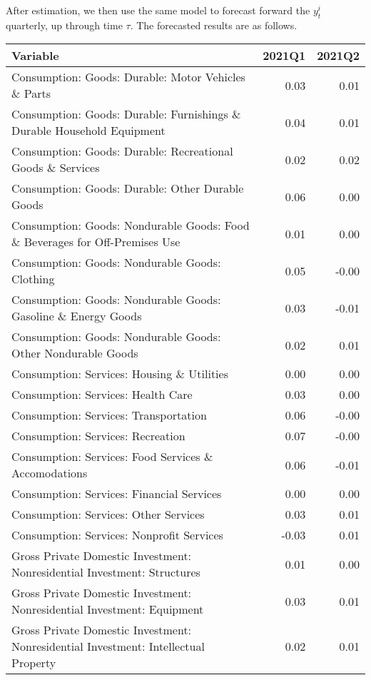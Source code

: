 \documentclass[11pt, letterpaper]{article}\usepackage[]{graphicx}\usepackage[]{color}
\begin{document}
After estimation, we then use the same model to forecast forward the $y^i_t$ quarterly, up through time $\tau$. 
The forecasted results are as follows.
\begin{table}[H]
\centering
\begingroup\scriptsize
\begin{tabular}{lrr}
  \hline
Variable & 2021Q1 & 2021Q2 \\ 
  \hline
Consumption: Goods: Durable: Motor Vehicles \& Parts & 0.03 & 0.01 \\ 
  Consumption: Goods: Durable: Furnishings \& Durable Household Equipment & 0.04 & 0.01 \\ 
  Consumption: Goods: Durable: Recreational Goods \& Services & 0.02 & 0.02 \\ 
  Consumption: Goods: Durable: Other Durable Goods & 0.06 & 0.00 \\ 
  Consumption: Goods: Nondurable Goods: Food \& Beverages for Off-Premises Use & 0.01 & 0.00 \\ 
  Consumption: Goods: Nondurable Goods: Clothing & 0.05 & -0.00 \\ 
  Consumption: Goods: Nondurable Goods: Gasoline \& Energy Goods & 0.03 & -0.01 \\ 
  Consumption: Goods: Nondurable Goods: Other Nondurable Goods & 0.02 & 0.01 \\ 
  Consumption: Services: Housing \& Utilities & 0.00 & 0.00 \\ 
  Consumption: Services: Health Care & 0.03 & 0.00 \\ 
  Consumption: Services: Transportation & 0.06 & -0.00 \\ 
  Consumption: Services: Recreation & 0.07 & -0.00 \\ 
  Consumption: Services: Food Services \& Accomodations & 0.06 & -0.01 \\ 
  Consumption: Services: Financial Services & 0.00 & 0.00 \\ 
  Consumption: Services: Other Services & 0.03 & 0.01 \\ 
  Consumption: Services: Nonprofit Services & -0.03 & 0.01 \\ 
  Gross Private Domestic Investment: Nonresidential Investment: Structures & 0.01 & 0.00 \\ 
  Gross Private Domestic Investment: Nonresidential Investment: Equipment & 0.03 & 0.01 \\ 
  Gross Private Domestic Investment: Nonresidential Investment: Intellectual Property & 0.02 & 0.01 \\ 

\end{tabular}
\end{table}
\end{document}
